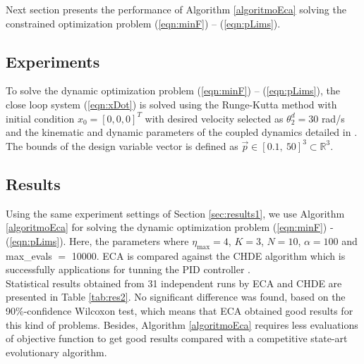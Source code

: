 \documentclass[12pt,letterpape]{article}
\begin{document}
Next section presents the performance of Algorithm \ref{algoritmoEca} solving the
constrained optimization problem (\ref{eqn:minF}) -- (\ref{eqn:pLims}).

\subsection{Experiments} %

To solve the dynamic optimization problem (\ref{eqn:minF}) -- (\ref{eqn:pLims}),
the close loop system (\ref{eqn:xDot}) is solved using the Runge-Kutta method
\cite{dormand80} with initial condition $x_0 = [0,0,0]^T$ with desired
velocity selected as $\theta_2^d = 30$ rad/s and the kinematic and dynamic parameters
of the coupled dynamics detailed in \cite{calva13}. The bounds of the design
variable vector is defined as $\vec{p} \in [0.1, \ 50]^3 \subset \mathbb{R}^3 $.\\

\subsection{Results} %
\label{sub:results}

Using the same experiment settings of Section \ref{sec:results1}, we use Algorithm 
\ref{algoritmoEca} for solving the dynamic optimization problem (\ref{eqn:minF}) - (\ref{eqn:pLims}).
Here, the parameters where $\eta_{\max} = 4$, $K = 3$, $N = 10$, $\alpha = 100$
and max\_evals $=$ 10000. ECA is compared against the CHDE algorithm which is successfully applications for tunning the PID controller \cite{calva13}.\\

Statistical results obtained from 31 independent runs by ECA and CHDE are presented
in Table \ref{tab:res2}. No significant difference was found, based on the
90\%-confidence Wilcoxon test, which means that ECA obtained good results for this
kind of problems. Besides, Algorithm \ref{algoritmoEca} requires less evaluations
of objective function to get good results compared with a competitive state-art
evolutionary algorithm.\\


\end{document}
